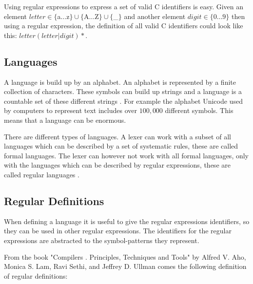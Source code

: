 \begin{example}\label{regexpEx}
Using regular expressions to express a set of valid C identifiers is easy.
Given an element $letter \in \{$a$ \dots $z$\} \cup \{$A$ \dots $Z$\} \cup 
\{$\_$\}$ and another element $digit \in \{0 \dots 9\}$ then using a regular
expression, the definition of all valid C identifiers 
could look like this: $letter (letter | digit)*$. 
\end{example}

\subsection{Languages}
A language is build up by an alphabet. An alphabet is represented by a finite
collection of characters. These symbols can build up strings and a language is
a countable set of these different strings \cite{Aho2006}. For example the
alphabet Unicode used by computers to represent text includes over $100,000$
different symbols. This means that a language can be enormous.

There are different types of languages. A lexer can work with a subset of all
languages which can be described by a set of systematic rules, these are called
formal languages. The lexer can however not work with all formal languages, only
with the languages which can be described by regular expressions, these are
called regular languages \cite{Ranta2012}. 

\subsection{Regular Definitions}
When defining a language it is useful to give the regular expressions
identifiers, so they can be used in other regular expressions.
The identifiers for the regular expressions are abstracted to the
symbol-patterns they represent.

From the book "Compilers . Principles, Techniques and Tools" by Alfred V.
Aho, Monica S. Lam, Ravi Sethi, and Jeffrey D. Ullman comes the following
definition of regular definitions:

